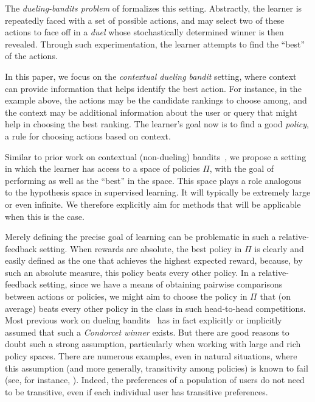 The {\em dueling-bandits problem} of \citet{yue09:k-arm} formalizes this setting. Abstractly, the learner is repeatedly faced with a set of possible actions, and may select two of these actions to face off in a {\em duel} whose stochastically determined winner is then revealed. Through such experimentation, the learner attempts to find the ``best'' of the actions.

In this paper, we focus on the \emph{contextual dueling bandit} setting, where context can provide information that helps identify the best action. For instance, in the example above, the actions may be the candidate rankings to choose among, and the context may be additional information about the user or query that might help in choosing the best ranking. The learner's goal now is to find a good {\em policy}, a rule for choosing actions based on context.

Similar to prior work on contextual (non-dueling) bandits~\citep{EXP4,LangfordZh07,dudik2011efficient,AgarwalEtAl14}, we propose a setting in which the learner has access to a space of policies $\Pi$, with the goal of performing as well as the ``best'' in the space. This space plays a role analogous to the hypothesis space in supervised learning. It will typically be extremely large or even infinite. We therefore explicitly aim for methods that will be applicable when this is the case.

Merely defining the precise goal of learning can be problematic in such a relative-feedback setting. When rewards are absolute, the best policy in $\Pi$ is clearly and easily defined as the one that achieves the highest expected reward, because, by such an absolute measure, this policy beats every other policy. In a relative-feedback setting, since we have a means of obtaining pairwise comparisons between actions or policies, we might aim to choose the policy in $\Pi$ that (on average) beats every other policy in the class in such head-to-head competitions. Most previous work on dueling bandits~\citep{yue09:k-arm,yue2011beat,Urvoy:2013,RUCB2014} has in fact explicitly or implicitly assumed that such a {\em Condorcet winner\/}
exists.
But there are good reasons to doubt such a strong assumption, particularly when working with large and rich policy spaces. There are numerous examples, even in natural situations, where this assumption (and more generally, transitivity among policies) is known to fail (see, for instance, \citealp{gardner:1970,RCS2014}).
Indeed, the preferences of a population of users do not need to be transitive, even if each individual user has transitive preferences.

